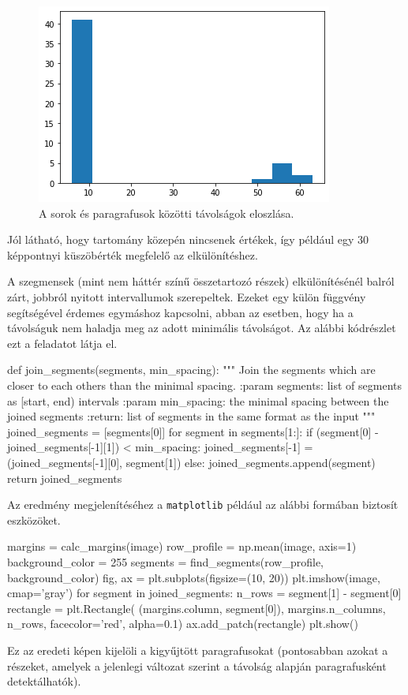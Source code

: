 \begin{figure}[h!]
\centering
\includegraphics[scale=1]{images/segment_hist.png}
\caption{A sorok és paragrafusok közötti távolságok eloszlása.}
\label{fig:segment_hist}
\end{figure}

Jól látható, hogy tartomány közepén nincsenek értékek, így például egy 30 képpontnyi küszöbérték megfelelő az elkülönítéshez.

A szegmensek (mint nem háttér színű összetartozó részek) elkülönítésénél balról zárt, jobbról nyitott intervallumok szerepeltek.
Ezeket egy külön függvény segítségével érdemes egymáshoz kapcsolni, abban az esetben, hogy ha a távolságuk nem haladja meg az adott minimális távolságot.
Az alábbi kódrészlet ezt a feladatot látja el.
\begin{python}
def join_segments(segments, min_spacing):
    """
    Join the segments which are closer to each others
    than the minimal spacing.
    :param segments: list of segments as [start, end) intervals
    :param min_spacing: the minimal spacing between the joined segments
    :return: list of segments in the same format as the input
    """
    joined_segments = [segments[0]]
    for segment in segments[1:]:
        if (segment[0] - joined_segments[-1][1]) < min_spacing:
            joined_segments[-1] = (joined_segments[-1][0], segment[1])
        else:
            joined_segments.append(segment)
    return joined_segments
\end{python}
Az eredmény megjelenítéséhez a \texttt{matplotlib} például az alábbi formában biztosít eszközöket.
\begin{python}
margins = calc_margins(image)
row_profile = np.mean(image, axis=1)
background_color = 255
segments = find_segments(row_profile, background_color)
fig, ax = plt.subplots(figsize=(10, 20))
plt.imshow(image, cmap='gray')
for segment in joined_segments:
    n_rows = segment[1] - segment[0]
    rectangle = plt.Rectangle(
        (margins.column, segment[0]), margins.n_columns, n_rows,
        facecolor='red', alpha=0.1)
    ax.add_patch(rectangle)
plt.show()
\end{python}
Ez az eredeti képen kijelöli a kigyűjtött paragrafusokat (pontosabban azokat a részeket, amelyek a jelenlegi változat szerint a távolság alapján paragrafusként detektálhatók).


